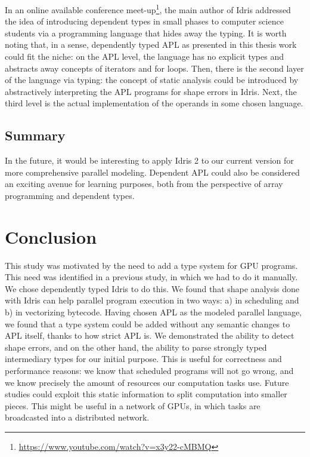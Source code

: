 \documentclass{report}
\begin{document}
In an online available conference meet-up\footnote{\url{https://www.youtube.com/watch?v=x3y22-cMBMQ}}, the main author of Idris addressed the idea of introducing dependent types in small phases to computer science students via a programming language that hides away the typing. It is worth noting that, in a sense, dependently typed APL as presented in this thesis work could fit the niche: on the APL level, the language has no explicit types and abstracts away concepts of iterators and for loops. Then, there is the second layer of the language via typing: the concept of static analysis could be introduced by abstractively interpreting the APL programs for shape errors in Idris. Next, the third level is the actual implementation of the operands in some chosen language.

\section*{Summary}

In the future, it would be interesting to apply Idris 2 to our current version for more comprehensive parallel modeling. Dependent APL could also be considered an exciting avenue for learning purposes, both from the perspective of array programming and dependent types.

\chapter{Conclusion}
\label{ch:conclusion}


This study was motivated by the need to add a type system for GPU programs. This need was identified in a previous study, in which we had to do it manually. We chose dependently typed Idris to do this. We found that shape analysis done with Idris can help parallel program execution in two ways: a) in scheduling and b) in vectorizing bytecode. Having chosen APL as the modeled parallel language, we found that a type system could be added without any semantic changes to APL itself, thanks to how strict APL is. We demonstrated the ability to detect shape errors, and on the other hand, the ability to parse strongly typed intermediary types for our initial purpose. This is useful for correctness and performance reasons: we know that scheduled programs will not go wrong, and we know precisely the amount of resources our computation tasks use. Future studies could exploit this static information to split computation into smaller pieces. This might be useful in a network of GPUs, in which tasks are broadcasted into a distributed network.
\end{document}
